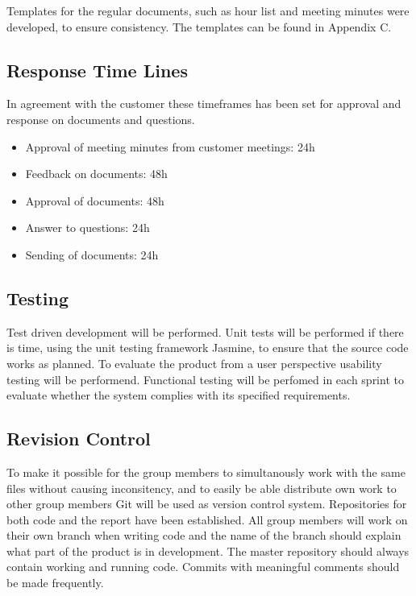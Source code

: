 Templates for the regular documents, such as hour list and meeting minutes were developed, to ensure consistency. The templates can be found in Appendix C.

\subsection{Response Time Lines}

In agreement with the customer these timeframes has been set for approval and response on documents and questions.

\begin{itemize}
	\item Approval of meeting minutes from customer meetings: 24h
	\item Feedback on documents: 48h
	\item Approval of documents: 48h
	\item Answer to questions: 24h
	\item Sending of documents: 24h
\end{itemize}

\subsection{Testing}

Test driven development will be performed. Unit tests will be performed if there is time, using the unit testing framework Jasmine, to ensure that the source code works as planned. To evaluate the product from a user perspective usability testing will be performend. Functional testing will be perfomed in each sprint to evaluate whether the system complies with its specified requirements.

\subsection{Revision Control}

To make it possible for the group members to simultanously work with the same files without causing inconsitency, and to easily be able distribute own work to other group members Git will be used as version control system. Repositories for both code and the report have been established. All group members will work on their own branch when writing code and the name of the branch should explain what part of the product is in development. The master repository should always contain working and running code. Commits with meaningful comments should be made frequently.

